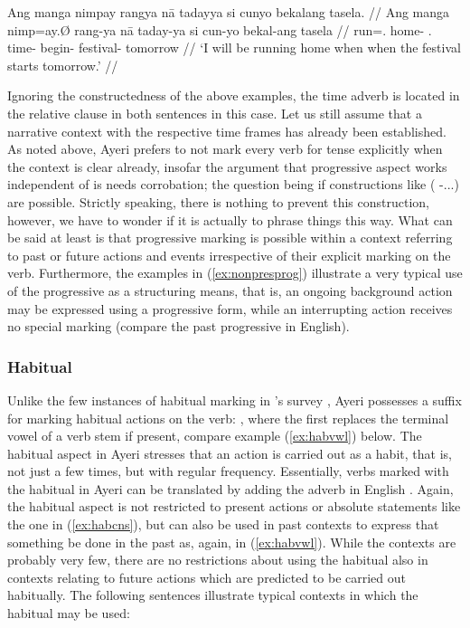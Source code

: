 \a\label{ex:futprog}\begingl
	\gla Ang manga nimpay rangya nā tadayya si cunyo bekalang tasela. //
	\glb Ang manga nimp=ay.Ø rang-ya nā taday-ya si cun-yo bekal-ang 
		tasela //
	\glc \AgtT{} \Prog{} run=\Fsg{}.\Top{} home-\Loc{} \Fsg{}.\Gen{} 
		time-\Loc{} \Rel{} begin-\TsgN{} festival-\Aarg{} tomorrow //
	\glft `I will be running home when when the festival starts 
		tomorrow.' //
\endgl

\xe

Ignoring the constructedness of the above examples, the time adverb is located 
in the relative clause in both sentences in this case. Let us still assume that 
a narrative context with the respective time frames has already been 
established. As noted above, Ayeri prefers to not mark every verb for tense 
explicitly when the context is clear already, insofar the argument that 
progressive aspect works independent of  is needs corrobation; the 
question being if constructions like  (\Prog{} 
\Pst{}-...) are possible. Strictly speaking, there is nothing to prevent this 
construction, however, we have to wonder if it is actually  to 
phrase things this way. What can be said at least is that progressive marking 
is possible within a context referring to past or future actions and events 
irrespective of their explicit marking on the verb. Furthermore, the examples 
in (\ref{ex:nonpresprog}) illustrate a very typical use of the progressive as a 
structuring means, that is, an ongoing background action may be expressed using 
a progressive form, while an interrupting action receives no special marking 
(compare the past progressive in English).


\subsubsection{Habitual}

Unlike the few instances of habitual marking in \citeauthor{dahl1985}'s survey 
\citep[96]{dahl1985}, Ayeri possesses a suffix for marking habitual actions on 
the verb: , where the first  replaces the terminal vowel 
of a verb stem if present, compare example (\ref{ex:habvwl}) below. The 
habitual aspect in Ayeri stresses that an action is carried out as a habit, that 
is, not just a few times, but with regular frequency. Essentially, verbs marked 
with the habitual in Ayeri can be translated by adding the adverb  
in English \citep[97]{dahl1985}. Again, the habitual aspect is not restricted to 
present actions or absolute statements like the one in (\ref{ex:habcns}), but 
can also be used in past contexts to express that something  be done 
in the past as, again, in (\ref{ex:habvwl}). While the contexts are probably 
very few, there are no restrictions about using the habitual also in contexts 
relating to future actions which are predicted to be carried out habitually. The 
following sentences illustrate typical contexts in which the habitual may be 
used:

